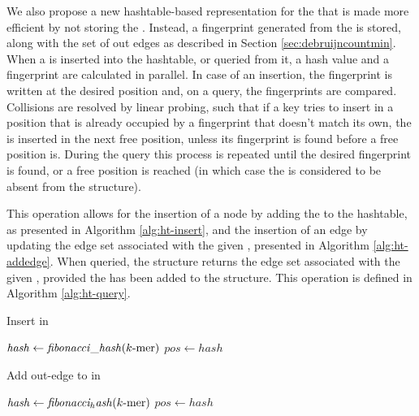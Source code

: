 We also propose a new hashtable-based representation for the \dBG that is made more efficient by not storing the \kmer. Instead,
a fingerprint generated from the \kmer is stored, along with the set of out edges as described in Section \ref{sec:debruijncountmin}.
When a \kmer is inserted into the hashtable, or queried from it, a hash value and a fingerprint are calculated in parallel.
In case of an insertion, the fingerprint is written at the desired position and, on a query, the fingerprints are compared. Collisions
are resolved by linear probing, such that if a key tries to insert in a position that is already occupied by a fingerprint that doesn't 
match its own, the \kmer is inserted in the next free position, unless its fingerprint is found before a free position is. During the
query this process is repeated until the desired fingerprint is found, or a free position is reached (in which case the \kmer is
considered to be absent from the structure).

This operation allows for the insertion of a node by adding the \kmer to the hashtable, as presented in Algorithm \ref{alg:ht-insert},
and the insertion of an edge by updating the edge set associated with the given \kmer, presented in Algorithm \ref{alg:ht-addedge}.
When queried, the structure returns the edge set associated with the given \kmer, provided the \kmer has been added to the structure.
This operation is defined in Algorithm \ref{alg:ht-query}.

\begin{algorithm}
  \caption{Insert \kmer in \dBHT}\label{alg:ht-insert}
  \KwData{$\kmer$}
  $\mathit{hash} \gets \mathit{fibonacci\_hash}(\mbox{$k$-mer})$\;
  $\mathit{pos} \gets \mathit{hash}$\;
\end{algorithm}

\begin{algorithm}
  \caption{Add out-edge to \kmer in \dBHT}\label{alg:ht-addedge}
  $\mathit{hash} \gets \mathit{fibonacci_hash}(\mbox{$k$-mer})$\;
  $\mathit{pos} \gets \mathit{hash}$\;
\end{algorithm}

